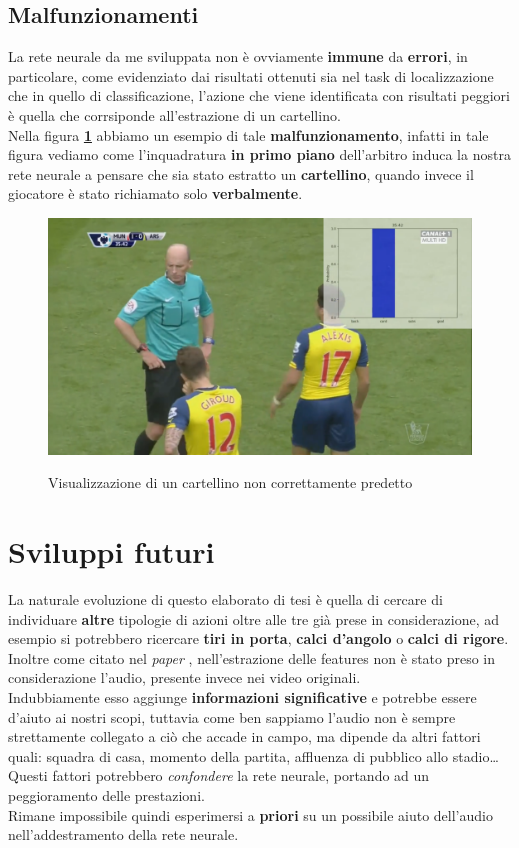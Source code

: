 \subsection{Malfunzionamenti}
La rete neurale da me sviluppata non è ovviamente \textbf{immune} da \textbf{errori}, in particolare, come evidenziato dai risultati ottenuti sia nel task di localizzazione che in quello di classificazione, l'azione che viene identificata con risultati peggiori è quella che corrsiponde all'estrazione di un cartellino.
\\Nella figura \textbf{\ref{figure : fakecard}} abbiamo un esempio di tale \textbf{malfunzionamento}, infatti in tale figura vediamo come l'inquadratura \textbf{in primo piano} dell'arbitro induca la nostra rete neurale a pensare che sia stato estratto un \textbf{cartellino}, quando invece il giocatore è stato richiamato solo \textbf{verbalmente}.
\begin{figure}[H]
\centering
\caption{Visualizzazione di un cartellino non correttamente predetto}
\includegraphics[width=\linewidth]{img/fakecardHQ.png}
\label{figure : fakecard}
\end{figure}
\section{Sviluppi futuri}
La naturale evoluzione di questo elaborato di tesi è quella di cercare di individuare \textbf{altre} tipologie di azioni oltre alle tre già prese in considerazione, ad esempio si potrebbero ricercare \textbf{tiri in porta}, \textbf{calci d'angolo} o \textbf{calci di rigore}.
\\Inoltre come citato nel \textit{paper} \citep{soccerNet}, nell'estrazione delle features non è stato preso in considerazione l'audio, presente invece nei video originali.
\\Indubbiamente esso aggiunge \textbf{informazioni significative} e potrebbe essere d'aiuto ai nostri scopi, tuttavia come ben sappiamo l'audio non è sempre strettamente collegato a ciò che accade in campo, ma dipende da altri fattori quali: squadra di casa, momento della partita, affluenza di pubblico allo stadio\ldots
\\Questi fattori potrebbero \textit{confondere} la rete neurale, portando ad un peggioramento delle prestazioni.
\\Rimane impossibile quindi esperimersi a \textbf{priori} su un possibile aiuto dell'audio nell'addestramento della rete neurale.
